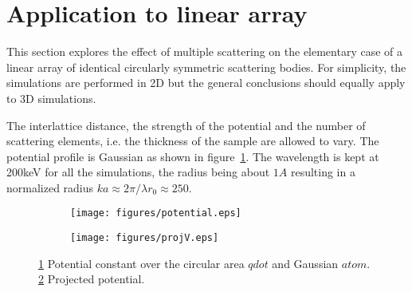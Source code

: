 \documentclass[a4paper,10pt]{article}
\begin{document}
\section{Application to linear array}\label{section:linearArray}


This section explores the effect of multiple scattering on the elementary case of a linear array of identical
circularly symmetric scattering bodies.
For simplicity, the simulations are performed in 2D but the general conclusions should equally apply to 3D
simulations.

The interlattice distance, the strength of the potential and the number of scattering elements, i.e. the thickness
of the sample are allowed to vary.
The potential profile is Gaussian as shown in figure~\ref{fig:singleArrayV}.
The wavelength is kept at 200keV for all the simulations, the radius being about $1A$ resulting in a
normalized radius $ka\approx 2\pi/\lambda r_0\approx 250$.



\begin{figure}[h!]
	\begin{subfigure}{0.45\textwidth}
		\centering
		\texttt{[image: figures/potential.eps]}
		\caption{}\label{fig:singleArrayV}
	\end{subfigure}
	\begin{subfigure}{0.45\textwidth}
		\centering
		\texttt{[image: figures/projV.eps]}
		\caption{}\label{fig:singleArrayVproj}
	\end{subfigure}

	\caption[single array]{
		\ref{fig:singleArrayV} Potential constant over the circular area $qdot$ and Gaussian $atom$.
		\ref{fig:singleArrayVproj} Projected potential.
	}\label{fig:singleArrayVV}
\end{figure}
\end{document}
